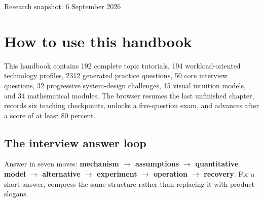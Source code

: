 \begin{titlepage}\pagecolor{navy}\color{white}\vspace*{1.1in}{\Huge\bfseries AI Engineering\\Interview Atlas\par}\vspace{.35in}{\Large Mathematical tutorials, technology field guide, systems, and 2,000+ questions\par}\vspace{.35in}{\large 34 derivations \textbullet\ 15 visual models \textbullet\ 194 technology profiles \textbullet\ 192 deep lessons\par}\vfill{\large Research snapshot: 6 September 2026\par}\vspace{.15in}{\normalsize Primary papers, official documentation, specifications, and standards\par}\vspace{.7in}{\color{cyan}\rule{\textwidth}{3pt}}\end{titlepage}\nopagecolor\color{black}
\tableofcontents\newpage
\section{How to use this handbook}
This handbook contains 192 complete topic tutorials, 194 workload-oriented technology profiles, 2312 generated practice questions, 50 core interview questions, 32 progressive system-design challenges, 15 visual intuition models, and 34 mathematical modules. The browser resumes the last unfinished chapter, records six teaching checkpoints, unlocks a five-question exam, and advances after a score of at least 80 percent.
\subsection{The interview answer loop}
Answer in seven moves: \textbf{mechanism $\rightarrow$ assumptions $\rightarrow$ quantitative model $\rightarrow$ alternative $\rightarrow$ experiment $\rightarrow$ operation $\rightarrow$ recovery}. For a short answer, compress the same structure rather than replacing it with product slogans.
